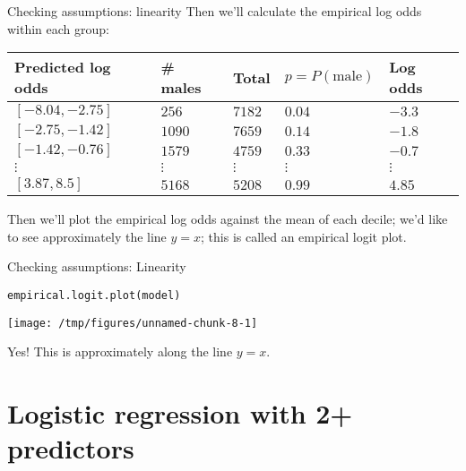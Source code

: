 \documentclass{beamer}\usepackage[]{graphicx}\usepackage[]{color}
\makeatletter
\def\maxwidth{ %
  \ifdim\Gin@nat@width>\linewidth
    \linewidth
  \else
    \Gin@nat@width
  \fi
}
\newcommand{\hlstd}[1]{\textcolor[rgb]{1,0.894,0.769}{#1}}%
\newcommand{\hlkwd}[1]{\textcolor[rgb]{1,0.78,0.769}{#1}}%
\newenvironment{kframe}{%
 \def\at@end@of@kframe{}%
 \ifinner\ifhmode%
  \def\at@end@of@kframe{\end{minipage}}%
  \begin{minipage}{\columnwidth}%
 \fi\fi%
 \def\FrameCommand##1{\hskip\@totalleftmargin \hskip-\fboxsep
 \colorbox{shadecolor}{##1}\hskip-\fboxsep
     \hskip-\linewidth \hskip-\@totalleftmargin \hskip\columnwidth}%
 \MakeFramed {\advance\hsize-\width
   \@totalleftmargin\z@ \linewidth\hsize
   \@setminipage}}%
 {\par\unskip\endMakeFramed%
 \at@end@of@kframe}
\newenvironment{knitrout}{}{} %
\makeatother
\begin{document}
\begin{darkframes}
    \begin{frame}{Checking assumptions: linearity}
      Then we'll calculate the empirical log odds within each group:

      \begin{center}
        \begin{tabular}{lllll}
          Predicted log odds & \# males & Total & $p=P(\text{male})$ & Log odds \\
          \hline
          $[ -8.04, -2.75 ]$ & $256$ &  $7182$ & $0.04$ & $-3.3$ \\
          $[ -2.75, -1.42 ]$ & $1090$ &  $7659$ & $0.14$ & $-1.8$ \\
          $[ -1.42, -0.76 ]$ & $1579$ &  $4759$ & $0.33$ & $-0.7$ \\
          $\vdots$ & $\vdots$ & $\vdots$ & $\vdots$ & $\vdots$ \\
          $[ 3.87, 8.5 ]$ & $5168$ &  $5208$ & $0.99$ & $4.85$ \\

        \end{tabular}
      \end{center}

      Then we'll plot the empirical log odds against the mean of each decile; we'd like to see approximately the line $y=x$; this is called an \alert{empirical logit plot}.
    \end{frame}

    \begin{frame}[fragile]{Checking assumptions: Linearity}
\begin{knitrout}
\color{fgcolor}\begin{kframe}
\begin{alltt}
\hlkwd{empirical.logit.plot}\hlstd{(model)}
\end{alltt}
\end{kframe}
\texttt{[image: /tmp/figures/unnamed-chunk-8-1]} 

\end{knitrout}
      \pause\vspace{-0.5cm}
      \greencheckmark \alert{Yes!} This is approximately along the line $y=x$.
    \end{frame}

    \section{Logistic regression with 2+ predictors}


\end{darkframes}
\end{document}
